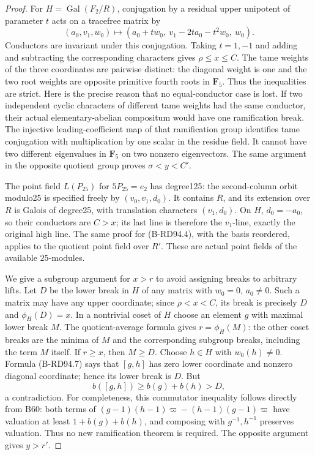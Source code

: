 \begin{proof}
For $H=\operatorname{Gal}(F_2/R)$, conjugation by a residual upper
unipotent of parameter $t$ acts on a tracefree matrix by
\[
 (a_0,v_1,w_0)\longmapsto
 (a_0+tw_0,\ v_1-2ta_0-t^2w_0,\ w_0).             \tag{B-RD94.7}
\]
Conductors are invariant under this conjugation. Taking $t=1,-1$
and adding and subtracting the corresponding characters gives
$\rho\le x\le C$. The tame weights of the three coordinates are
pairwise distinct: the diagonal weight is one and the two root
weights are opposite primitive fourth roots in $\mathbf F_5$.
Thus the inequalities are strict. Here is the precise reason that
no equal-conductor case is lost. If two independent cyclic
characters of different tame weights had the same conductor, their
actual elementary-abelian compositum would have one ramification
break. The injective leading-coefficient map of that ramification
group identifies tame conjugation with multiplication by one scalar
in the residue field. It cannot have two different eigenvalues in
$\mathbf F_5$ on two nonzero eigenvectors. The same argument in the
opposite quotient group proves $\sigma<y<C'$.

The point field $L(P_{25})$ for $5P_{25}=e_2$ has degree125:
the second-column orbit modulo25 is specified freely by
$(v_0,v_1,d_0)$. It contains $R$, and its extension over $R$ is
Galois of degree25, with translation characters $(v_1,d_0)$.
On $H$, $d_0=-a_0$, so their conductors are $C>x$; its last
line is therefore the $v_1$-line, exactly the original high line.
The same proof for (B-RD94.4), with the basis reordered, applies
to the quotient point field over $R'$. These are actual point
fields of the available $25$-modules.

We give a subgroup argument for $x>r$ to avoid assigning breaks
to arbitrary lifts. Let $D$ be the lower break in $H$ of any
matrix with $w_0=0$, $a_0\ne0$. Such a matrix may have any upper
coordinate; since $\rho<x<C$, its break is precisely $D$ and
$\phi_H(D)=x$. In a nontrivial coset of $H$ choose an element
$g$ with maximal lower break $M$. The quotient-average formula
gives $r=\phi_H(M)$: the other coset breaks are the minima of
$M$ and the corresponding subgroup breaks, including the term
$M$ itself. If $r\ge x$, then $M\ge D$. Choose $h\in H$ with
$w_0(h)\ne0$. Formula (B-RD94.7) says that $[g,h]$ has zero
lower coordinate and nonzero diagonal coordinate; hence its lower
break is $D$. But
\[
                    b([g,h])\ge b(g)+b(h)>D,          \tag{B-RD94.8}
\]
a contradiction. For completeness, this commutator inequality
follows directly from B60: both terms of
$(g-1)(h-1)\varpi-(h-1)(g-1)\varpi$ have valuation at least
$1+b(g)+b(h)$, and composing with $g^{-1},h^{-1}$ preserves
valuation. Thus no new ramification theorem is required. The
opposite argument gives $y>r'$.


\end{proof}
